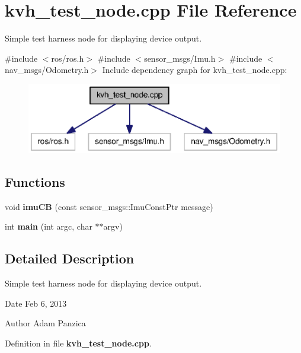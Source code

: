 \section{kvh\-\_\-test\-\_\-node.\-cpp \-File \-Reference}
\label{kvh__test__node_8cpp}


\-Simple test harness node for displaying device output.  


{\ttfamily \#include $<$ros/ros.\-h$>$}\*
{\ttfamily \#include $<$sensor\-\_\-msgs/\-Imu.\-h$>$}\*
{\ttfamily \#include $<$nav\-\_\-msgs/\-Odometry.\-h$>$}\*
\-Include dependency graph for kvh\-\_\-test\-\_\-node.\-cpp\-:
\nopagebreak
\begin{figure}[H]
\begin{center}
\leavevmode
\includegraphics[width=350pt]{kvh__test__node_8cpp__incl}
\end{center}
\end{figure}
\subsection*{\-Functions}
\begin{DoxyCompactItemize}
\item 
void {\bf imu\-C\-B} (const sensor\-\_\-msgs\-::\-Imu\-Const\-Ptr message)
\item 
int {\bf main} (int argc, char $\ast$$\ast$argv)
\end{DoxyCompactItemize}


\subsection{\-Detailed \-Description}
\-Simple test harness node for displaying device output. \begin{DoxyDate}{\-Date}
\-Feb 6, 2013 
\end{DoxyDate}
\begin{DoxyAuthor}{\-Author}
\-Adam \-Panzica 
\end{DoxyAuthor}


\-Definition in file {\bf kvh\-\_\-test\-\_\-node.\-cpp}.



